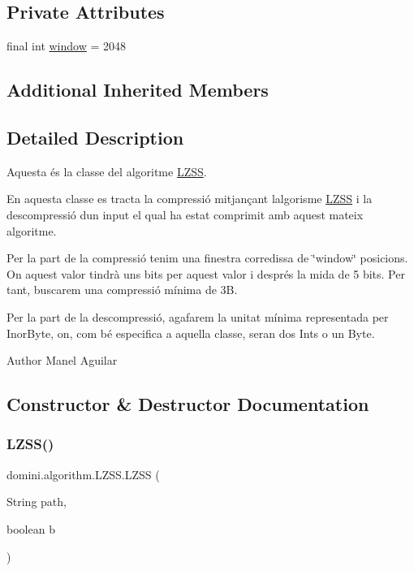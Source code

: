 \subsection*{Private Attributes}
\begin{DoxyCompactItemize}
\item 
final int \hyperlink{classdomini_1_1algorithm_1_1LZSS_a00d9f2e9bc2baa39513fad040b8e7123}{window} = 2048
\end{DoxyCompactItemize}
\subsection*{Additional Inherited Members}


\subsection{Detailed Description}
Aquesta és la classe del algoritme \hyperlink{classdomini_1_1algorithm_1_1LZSS}{L\+Z\+SS}. 

En aquesta classe es tracta la compressió mitjançant l\textquotesingle{}algorisme \hyperlink{classdomini_1_1algorithm_1_1LZSS}{L\+Z\+SS} i la descompressió d\textquotesingle{}un input el qual ha estat comprimit amb aquest mateix algoritme.

Per la part de la compressió tenim una finestra corredissa de \char`\"{}window\char`\"{} posicions. On aquest valor tindrà uns bits per aquest valor i després la mida de 5 bits. Per tant, buscarem una compressió mínima de 3B.

Per la part de la descompressió, agafarem la unitat mínima representada per Inor\+Byte, on, com bé especifica a aquella classe, seran dos Int\textquotesingle{}s o un Byte.

\begin{DoxyAuthor}{Author}
Manel Aguilar 
\end{DoxyAuthor}


\subsection{Constructor \& Destructor Documentation}
\mbox{\label{classdomini_1_1algorithm_1_1LZSS_a8db81d23b97e401015ec60763ef13aba}} 
\subsubsection{\texorpdfstring{L\+Z\+S\+S()}{LZSS()}\hspace{0.1cm}{\footnotesize\ttfamily [1/2]}}
{\footnotesize\ttfamily domini.\+algorithm.\+L\+Z\+S\+S.\+L\+Z\+SS (\begin{DoxyParamCaption}\item[{String}]{path,  }\item[{boolean}]{b }\end{DoxyParamCaption})\hspace{0.3cm}{\ttfamily [inline]}}



